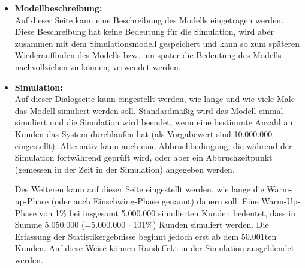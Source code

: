 \documentclass[deutsch]{svmono}
\begin{document}
\begin{itemize}
\item
\textbf{Modellbeschreibung:}\\
Auf dieser Seite kann eine Beschreibung des Modells eingetragen werden. Diese Beschreibung hat keine Bedeutung für die Simulation, wird aber zusammen mit dem Simulationsmodell gespeichert und kann so zum späteren Wiederauffinden des Modells bzw. um später die Bedeutung des Modells nachvollziehen zu können, verwendet werden.
\item
\textbf{Simulation:}\\
Auf dieser Dialogseite kann eingestellt werden, wie lange und wie viele Male das Modell simuliert werden soll. Standardmäßig wird das Modell einmal simuliert und die Simulation wird beendet, wenn eine bestimmte Anzahl an Kunden das System durchlaufen hat (als Vorgabewert sind 10.000.000 eingestellt). Alternativ kann auch eine Abbruchbedingung, die während der Simulation fortwährend geprüft wird, oder aber ein Abbruchzeitpunkt (gemessen in der Zeit in der Simulation) angegeben werden.

Des Weiteren kann auf dieser Seite eingestellt werden, wie lange die Warm-up-Phase (oder auch Einschwing-Phase genannt) dauern soll. Eine Warm-Up-Phase von 1\% bei insgesamt 5.000.000 simulierten Kunden bedeutet, dass in Summe 5.050.000 (=5.000.000 $\cdot$ 101\%) Kunden simuliert werden. Die Erfassung der Statistikergebnisse beginnt jedoch erst ab dem 50.001ten Kunden. Auf diese Weise können Randeffekt in der Simulation ausgeblendet werden.


\end{itemize}
\end{document}
